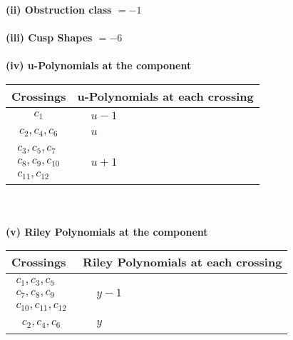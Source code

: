 \documentclass[1p]{elsarticle_modified}
\theoremstyle{definition}
\begin{document}
\flushleft \textbf{(ii) Obstruction class $= -1$}\\~\\
\flushleft \textbf{(iii) Cusp Shapes $= -6$}\\~\\
\newpage\renewcommand{\arraystretch}{1}
\flushleft \textbf{(iv) u-Polynomials at the component}\newline \\
\begin{tabular}{m{50pt}|m{274pt}}
Crossings & \hspace{64pt}u-Polynomials at each crossing \\
\hline $$\begin{aligned}c_{1}\end{aligned}$$&$\begin{aligned}
&u-1
\end{aligned}$\\
\hline $$\begin{aligned}c_{2},c_{4},c_{6}\end{aligned}$$&$\begin{aligned}
&u
\end{aligned}$\\
\hline $$\begin{aligned}c_{3},c_{5},c_{7}\\c_{8},c_{9},c_{10}\\c_{11},c_{12}\end{aligned}$$&$\begin{aligned}
&u+1
\end{aligned}$\\
\hline
\end{tabular}\\~\\
\newpage\renewcommand{\arraystretch}{1}
\flushleft \textbf{(v) Riley Polynomials at the component}\newline \\
\begin{tabular}{m{50pt}|m{274pt}}
Crossings & \hspace{64pt}Riley Polynomials at each crossing \\
\hline $$\begin{aligned}c_{1},c_{3},c_{5}\\c_{7},c_{8},c_{9}\\c_{10},c_{11},c_{12}\end{aligned}$$&$\begin{aligned}
&y-1
\end{aligned}$\\
\hline $$\begin{aligned}c_{2},c_{4},c_{6}\end{aligned}$$&$\begin{aligned}
&y
\end{aligned}$\\
\hline
\end{tabular}\\~\\
\end{document}

